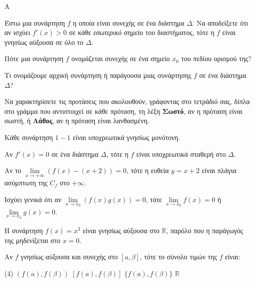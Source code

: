\begin{thema}{A}
\begin{erwthma}
    \item Έστω μια συνάρτηση $ f $ η οποία είναι συνεχής σε ένα διάστημα $ \varDelta $. Να αποδείξετε ότι αν ισχύει $ f'(x)>0 $ σε κάθε \textit{εσωτερικό} σημείο του διαστήματος, τότε η $ f $ είναι γνησίως αύξουσα σε όλο το $ \varDelta $.
    \item Πότε μια συνάρτηση $f$ ονομάζεται συνεχής σε ένα σημείο $x_0$ του πεδίου ορισμού της?
    \item Τι ονομάζουμε αρχική συνάρτηση ή παράγουσα μιας συνάρτησης $f$ σε ένα διάστημα $\Delta$?
    \item Να χαρακτηρίσετε τις προτάσεις που ακολουθούν, γράφοντας στο τετράδιό σας, δίπλα στο γράμμα που αντιστοιχεί σε κάθε πρόταση, τη λέξη \textbf{Σωστό}, αν η πρόταση είναι σωστή, ή \textbf{Λάθος}, αν η πρόταση είναι λανθασμένη.
    \begin{alist}
        \item Κάθε συνάρτηση $1-1$ είναι υποχρεωτικά γνησίως μονότονη.
        \item Αν $f'(x) = 0$ σε ένα διάστημα $\Delta$, τότε η $f$ είναι υποχρεωτικά σταθερή στο $\Delta$.
        \item Αν το $\lim\limits_{x\to +\infty} (f(x) - (x+2)) = 0$, τότε η ευθεία $y = x+2$ είναι πλάγια ασύμπτωτη της $C_f$ στο $+\infty$.
        \item Ισχύει γενικά ότι αν $\lim\limits_{x\to x_0} (f(x)g(x)) = 0$, τότε $\lim\limits_{x\to x_0} f(x) = 0$ ή $\lim\limits_{x\to x_0} g(x) = 0$.
        \item Η συνάρτηση $f(x) = x^3$ είναι γνησίως αύξουσα στο $\mathbb{R}$, παρόλο που η παράγωγός της μηδενίζεται στο $x=0$.
    \end{alist}
    \item Αν $f$ γνησίως αύξουσα και συνεχής στο $[a, \beta]$, τότε το σύνολο τιμών της $f$ είναι:
    \begin{tasks}[label=\let\textdexiakeraia\relax\alph*.](4)
        \task $(f(a), f(\beta))$
        \task $[f(a), f(\beta)]$
        \task $\{f(a), f(\beta)\}$
        \task $\mathbb{R}$
    \end{tasks}
\end{erwthma}
\end{thema}


